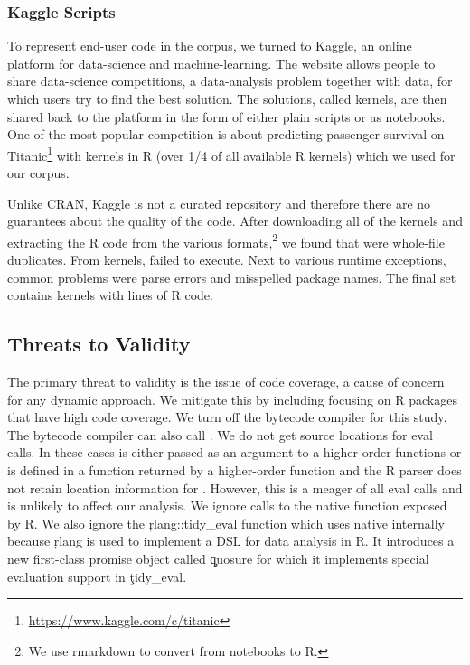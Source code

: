 \documentclass[USenglish,cleveref, autoref, thm-restate]{lipics-v2019}
\begin{document}
\subsubsection{Kaggle Scripts}

To represent end-user code in the corpus, we turned to Kaggle, an online
platform for data-science and machine-learning. The website allows people to
share data-science competitions, a data-analysis problem together with data,
for which users try to find the best solution. The solutions, called
{kernels}, are then shared back to the platform in the form of either plain
scripts or as notebooks.  One of the most popular competition is about
predicting passenger survival on
Titanic\footnote{\url{https://www.kaggle.com/c/titanic}} with \CorpusKaggle
kernels in R (over 1/4 of all available R kernels) which we used for our
corpus.

Unlike CRAN, Kaggle is not a curated repository and therefore there are no
guarantees about the quality of the code. After downloading all of the
\CorpusKaggle kernels and extracting the R code from the various
formats,\footnote{We use {\sf rmarkdown} to convert from notebooks to R.} we
found that \CorpusDuplicatedKaggle were whole-file duplicates. From
\CorpusRunnableKaggle kernels, \CorpusFailedKaggle failed to execute. Next
to various runtime exceptions, common problems were parse errors and
misspelled package names.  The final set contains \CorpusFinishedKaggle
kernels with \CorpusFinishedKaggleCodeRnd lines of R code.

\subsection{Threats to Validity}
The primary threat to validity is the issue of
code coverage, a cause of concern for any dynamic approach. We mitigate this
by including focusing on R packages that have high code coverage. We turn
off the bytecode compiler for this study. The bytecode compiler can also
call \eval. We do not get source locations for \UndefinedEvalsRnd eval
calls. In these cases \eval is either passed as an argument to a
higher-order functions or is defined in a function returned by a
higher-order function and the R parser does not retain location information
for \eval. However, this is a meager \PercentUndefinedEval of all eval calls
and is unlikely to affect our analysis. We ignore calls to the native \eval
function exposed by R. We also ignore the \c{rlang::tidy_eval} function
which uses native \eval internally because \c{rlang} is used to implement a
DSL for data analysis in R. It introduces a new first-class promise object
called \c{quosure} for which it implements special evaluation support in
\c{tidy_eval}.
\end{document}
